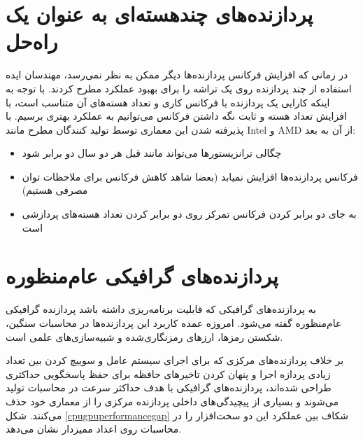 \documentclass{thesis}
\begin{document}
\section{
پردازنده‌های چند‌هسته‌ای به عنوان یک راه‌حل
}

در زمانی که افزایش فرکانس پردازنده‌ها دیگر ممکن به نظر نمی‌رسد، مهندسان ایده
استفاده از چند پردازنده روی یک تراشه را برای بهبود عملکرد مطرح کردند. با توجه
به اینکه کارایی یک پردازنده با فرکانس کاری و تعداد هسته‌های آن متناسب است، با
افزایش تعداد هسته و ثابت نگه داشتن فرکانس می‌توانیم به عملکرد بهتری برسیم. با
پذیرفته شدن این معماری توسط تولید کنندگان مطرح مانند
Intel
و
AMD
از آن به بعد:

\begin{itemize}
\item 
چگالی ترانزیستو‌ر‌ها می‌تواند مانند قبل هر دو سال دو‌ برابر 
شود
\item
فرکانس پردازنده‌ها افزایش نمیابد (بعضا شاهد کاهش فرکانس برای ملاحظات توان مصرفی
هستیم)
\item
به جای دو برابر کردن فرکانس تمرکز روی دو برابر کردن تعداد هسته‌های پردازشی است
\end{itemize}


\section{
پردازنده‌های گرافیکی عام‌منظوره
}

به پردازنده‌های گرافیکی که قابلیت برنامه‌ریزی داشته باشد پردازنده گرافیکی
عام‌منظوره
گفته می‌شود. امروزه عمده کاربرد این پردازنده‌ها در محاسبات سنگین، شکستن رمز‌ها،
ارز‌های رمزنگاری‌شده
و شبیه‌سازی‌های علمی است.

بر خلاف پردازنده‌های مرکزی که برای
اجرای سیستم عامل و
 سوییچ کردن
 بین تعداد زیادی پردازه
اجرا و پنهان کردن تاخیر‌های حافظه برای حفظ پاسخگویی حداکثری طراحی شده‌اند،
پردازنده‌های گرافیکی با هدف حداکثر سرعت در محاسبات تولید می‌شوند و بسیاری از
پیچیدگی‌های داخلی پردازنده مرکزی را از معماری خود حذف می‌کنند. شکل
\ref{cpugpuperformancegap}
شکاف بین عملکرد این دو سخت‌افزار‌ را در محاسبات روی اعداد ممیز‌دار نشان می‌دهد.
\end{document}

